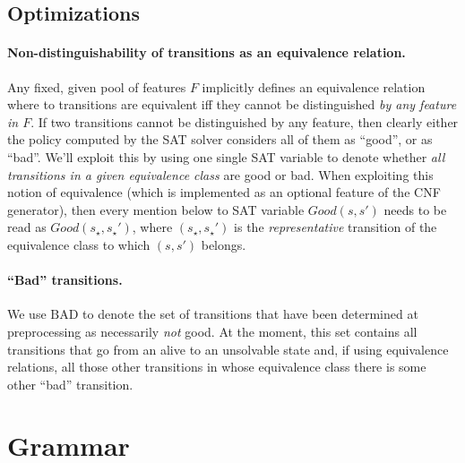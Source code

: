 \documentclass[a4paper]{article}
\newcommand{\badtx}{\ensuremath{\mathrm{BAD}}}
\begin{document}
\pagebreak


\subsection{Optimizations}

\paragraph{Non-distinguishability of transitions as an equivalence relation.}
Any fixed, given pool of features $F$ implicitly defines an equivalence relation where to transitions are
equivalent iff they cannot be distinguished \emph{by any feature in $F$}.
If two transitions cannot be distinguished by any feature, then clearly either the policy computed by the SAT solver
considers all of them as ``good'', or as ``bad''.
We'll exploit this by using one single SAT variable to denote whether \emph{all transitions in a given equivalence
class} are good or bad. When exploiting this notion of equivalence (which is implemented as an optional feature of
the CNF generator), then every mention below to SAT variable $Good(s, s')$ needs to be read as $Good(s_{\star}, s_{\star}')$,
where $(s_{\star}, s_{\star}')$ is the \emph{representative} transition of the equivalence class to which $(s, s')$ belongs.

\paragraph{``Bad'' transitions.}
We use \badtx{} to denote the set of transitions that have been determined at preprocessing as necessarily
\emph{not} good.
At the moment, this set contains all transitions that go from an alive to an unsolvable state and, if using
equivalence relations, all those other transitions in whose equivalence class there is some other ``bad'' transition.

\section{Grammar}
\end{document}
